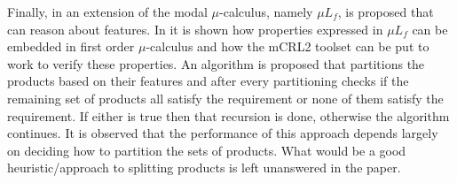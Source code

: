 Finally, in \cite{FTSMu} an extension of the modal $\mu$-calculus, namely $\mu L_f$, is proposed that can reason about features. In \cite{FamBasedModelCheckingWithMCRL2} it is shown how properties expressed in $\mu L_f$ can be embedded in first order $\mu$-calculus and how the mCRL2 toolset \cite{mCRL2Toolset} can be put to work to verify these properties. An algorithm is proposed that partitions the products based on their features and after every partitioning checks if the remaining set of products all satisfy the requirement or none of them satisfy the requirement. If either is true then that recursion is done, otherwise the algorithm continues. It is observed that the performance of this approach depends largely on deciding how to partition the sets of products. What would be a good heuristic/approach to splitting products is left unanswered in the paper.